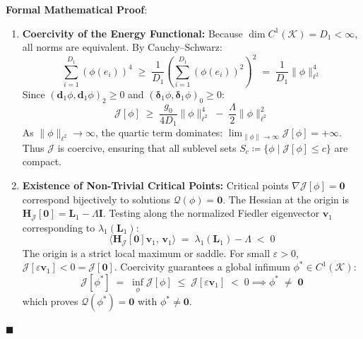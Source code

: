 \documentclass[
    12pt,
    a4paper,
    headings=normal,
    twoside=false,
    open=any,
    parskip=half
]{scrbook}
\newenvironment{myproof}[1][]{%
  \par\vspace{6pt}\noindent\textbf{\sffamily\color{maincolor}Formal Mathematical Proof\ifstrempty{#1}{}{ (#1)}}:\par\nopagebreak
}{%
  \penalty50\hfill\ensuremath{\blacksquare}\par\vspace{6pt}
}
\begin{document}
\begin{myproof}
\begin{enumerate}[label=\textbf{Part \arabic*:}, leftmargin=2em]
    \item \textbf{Coercivity of the Energy Functional:}
    Because $\dim C^1(\mathcal{K}) = D_1 < \infty$, all norms are equivalent. By Cauchy--Schwarz:
    \begin{equation*}
    \sum_{i=1}^{D_1} (\phi(e_i))^4 \;\ge\; \frac{1}{D_1} \left( \sum_{i=1}^{D_1} (\phi(e_i))^2 \right)^2 \;=\; \frac{1}{D_1} \|\phi\|_{\ell^2}^4
    \end{equation*}
    Since $(\mathbf{d}_1\phi, \mathbf{d}_1\phi)_2 \ge 0$ and $(\boldsymbol{\delta}_1\phi, \boldsymbol{\delta}_1\phi)_0 \ge 0$:
    \begin{equation*}
    \mathcal{J}[\phi] \;\ge\; \frac{g_0}{4 D_1} \|\phi\|_{\ell^2}^4 \;-\; \frac{\Lambda}{2} \|\phi\|_{\ell^2}^2
    \end{equation*}
    As $\|\phi\|_{\ell^2} \to \infty$, the quartic term dominates: $\lim_{\|\phi\| \to \infty} \mathcal{J}[\phi] = +\infty$. Thus $\mathcal{J}$ is coercive, ensuring that all sublevel sets $S_c \coloneqq \{\phi \mid \mathcal{J}[\phi] \le c\}$ are compact.

    \item \textbf{Existence of Non-Trivial Critical Points:}
    Critical points $\nabla \mathcal{J}[\phi] = \mathbf{0}$ correspond bijectively to solutions $\mathcal{Q}(\phi) = \mathbf{0}$. The Hessian at the origin is $\mathbf{H}_{\mathcal{J}}[\mathbf{0}] = \mathbf{L}_1 - \Lambda \mathbf{I}$. 
    Testing along the normalized Fiedler eigenvector $\mathbf{v}_1$ corresponding to $\lambda_1(\mathbf{L}_1)$:
    \begin{equation*}
    \langle \mathbf{H}_{\mathcal{J}}[\mathbf{0}] \mathbf{v}_1, \, \mathbf{v}_1 \rangle \;=\; \lambda_1(\mathbf{L}_1) - \Lambda \;<\; 0
    \end{equation*}
    The origin is a strict local maximum or saddle. For small $\varepsilon > 0$, $\mathcal{J}[\varepsilon \mathbf{v}_1] < 0 = \mathcal{J}[\mathbf{0}]$. Coercivity guarantees a global infimum $\phi^* \in C^1(\mathcal{K})$:
    \begin{equation*}
    \mathcal{J}[\phi^*] \;=\; \inf_\phi \mathcal{J}[\phi] \;\le\; \mathcal{J}[\varepsilon \mathbf{v}_1] \;<\; 0 \implies \phi^* \;\ne\; \mathbf{0}
    \end{equation*}
    which proves $\mathcal{Q}(\phi^*) = \mathbf{0}$ with $\phi^* \ne \mathbf{0}$.


\end{enumerate}
\end{myproof}
\end{document}
